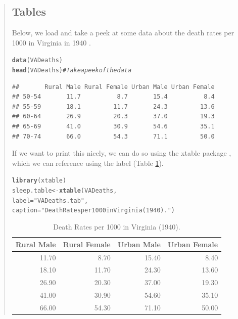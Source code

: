 \documentclass{article}\usepackage[]{graphicx}\usepackage[]{xcolor}
\makeatletter
\newcommand{\hlsng}[1]{\textcolor[rgb]{0.192,0.494,0.8}{#1}}%
\newcommand{\hlcom}[1]{\textcolor[rgb]{0.678,0.584,0.686}{\textit{#1}}}%
\newcommand{\hldef}[1]{\textcolor[rgb]{0.345,0.345,0.345}{#1}}%
\newcommand{\hlkwb}[1]{\textcolor[rgb]{0.69,0.353,0.396}{#1}}%
\newcommand{\hlkwc}[1]{\textcolor[rgb]{0.333,0.667,0.333}{#1}}%
\newcommand{\hlkwd}[1]{\textcolor[rgb]{0.737,0.353,0.396}{\textbf{#1}}}%
\newenvironment{kframe}{%
 \def\at@end@of@kframe{}%
 \ifinner\ifhmode%
  \def\at@end@of@kframe{\end{minipage}}%
  \begin{minipage}{\columnwidth}%
 \fi\fi%
 \def\FrameCommand##1{\hskip\@totalleftmargin \hskip-\fboxsep
 \colorbox{shadecolor}{##1}\hskip-\fboxsep
     \hskip-\linewidth \hskip-\@totalleftmargin \hskip\columnwidth}%
 \MakeFramed {\advance\hsize-\width
   \@totalleftmargin\z@ \linewidth\hsize
   \@setminipage}}%
 {\par\unskip\endMakeFramed%
 \at@end@of@kframe}
\newenvironment{knitrout}{}{} %
\makeatother
\begin{document}
\begin{multicols}{2}
\begin{quote}
\subsection{Tables}
\noindent
Below, we load and take a peek at some data about the death rates per 1000 in Virginia in 1940 \citep{VADeath}.
\begin{knitrout}\scriptsize
{}\color{fgcolor}\begin{kframe}
\begin{alltt}
\hlkwd{data}\hldef{(VADeaths)}
\hlkwd{head}\hldef{(VADeaths)} \hlcom{# Take a peek of the data}
\end{alltt}
\begin{verbatim}
##       Rural Male Rural Female Urban Male Urban Female
## 50-54       11.7          8.7       15.4          8.4
## 55-59       18.1         11.7       24.3         13.6
## 60-64       26.9         20.3       37.0         19.3
## 65-69       41.0         30.9       54.6         35.1
## 70-74       66.0         54.3       71.1         50.0
\end{verbatim}
\end{kframe}
\end{knitrout}
If we want to print this nicely, we can do so using the
xtable package \citep{xtable}, which we can reference
using the label (Table \ref{VADeaths.tab}).
\begin{knitrout}\scriptsize
{}\color{fgcolor}\begin{kframe}
\begin{alltt}
\hlkwd{library}\hldef{(xtable)}
\hldef{sleep.table}\hlkwb{<-}\hlkwd{xtable}\hldef{(VADeaths ,}
\hlkwc{label} \hldef{=} \hlsng{"VADeaths.tab"}\hldef{,}
\hlkwc{caption} \hldef{=} \hlsng{"Death Rates per 1000 in Virginia (1940)."}\hldef{)}
\end{alltt}
\end{kframe}
\end{knitrout}
\begin{table}[H]
\centering
\begingroup\small
\begin{tabular}{rrrr}
  \hline
Rural Male & Rural Female & Urban Male & Urban Female \\ 
  \hline
11.70 & 8.70 & 15.40 & 8.40 \\ 
  18.10 & 11.70 & 24.30 & 13.60 \\ 
  26.90 & 20.30 & 37.00 & 19.30 \\ 
  41.00 & 30.90 & 54.60 & 35.10 \\ 
  66.00 & 54.30 & 71.10 & 50.00 \\ 
   \hline
\end{tabular}
\endgroup
\caption{Death Rates per 1000 in Virginia (1940).} 
\label{VADeaths.tab}
\end{table}


\end{quote}
\end{multicols}
\end{document}
